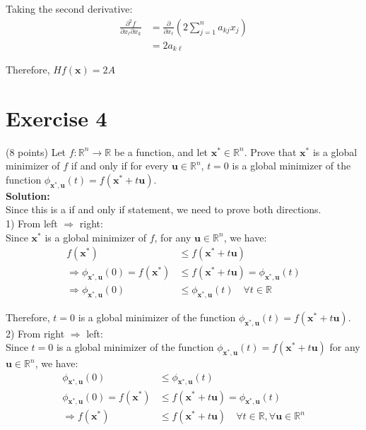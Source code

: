 \documentclass{article}
\begin{document}
Taking the second derivative:
\begin{align*}
\frac{\partial^2 f}{\partial x_\ell \partial x_k} &= \frac{\partial}{\partial x_\ell}(2\sum_{j=1}^n a_{kj}x_j) \\
&= 2a_{k\ell}
\end{align*}

Therefore, $Hf(\mathbf{x}) = 2A$

\newpage

\section*{Exercise 4}
(8 points) Let $f: \mathbb{R}^n \to \mathbb{R}$ be a function, and let $\mathbf{x}^* \in \mathbb{R}^n$. Prove that $\mathbf{x}^*$ is a global minimizer of $f$ if and only if for every $\mathbf{u} \in \mathbb{R}^n$, $t = 0$ is a global minimizer of the function $\phi_{\mathbf{x}^*,\mathbf{u}}(t) = f(\mathbf{x}^* + t\mathbf{u})$. \\

\textbf{Solution:} \\

Since this is a if and only if statement, we need to prove both directions. \\

1) From left $\Rightarrow$ right: \\

Since $\mathbf{x}^*$ is a global minimizer of $f$, for any $\mathbf{u} \in \mathbb{R}^n$, we have:
\begin{align*}
    f(\mathbf{x}^*) &\leq f(\mathbf{x}^* + t\mathbf{u}) \\
    \Rightarrow \phi_{\mathbf{x}^*,\mathbf{u}}(0) = f(\mathbf{x}^*) &\leq f(\mathbf{x}^* + t\mathbf{u}) = \phi_{\mathbf{x}^*,\mathbf{u}}(t) \\
    \Rightarrow \phi_{\mathbf{x}^*,\mathbf{u}}(0) &\leq \phi_{\mathbf{x}^*,\mathbf{u}}(t) \quad \forall t \in \mathbb{R}
\end{align*}

Therefore, $t = 0$ is a global minimizer of the function $\phi_{\mathbf{x}^*,\mathbf{u}}(t) = f(\mathbf{x}^* + t\mathbf{u})$. \\

2) From right $\Rightarrow$ left: \\

Since $t = 0$ is a global minimizer of the function $\phi_{\mathbf{x}^*,\mathbf{u}}(t) = f(\mathbf{x}^* + t\mathbf{u})$ for any $\mathbf{u} \in \mathbb{R}^n$, we have:
\begin{align*}
    \phi_{\mathbf{x}^*,\mathbf{u}}(0) &\leq \phi_{\mathbf{x}^*,\mathbf{u}}(t) \\
    \phi_{\mathbf{x}^*,\mathbf{u}}(0) = f(\mathbf{x}^*) &\leq f(\mathbf{x}^* + t\mathbf{u}) = \phi_{\mathbf{x}^*,\mathbf{u}}(t) \\
    \Rightarrow f(\mathbf{x}^*) &\leq f(\mathbf{x}^* + t\mathbf{u}) \quad \forall t \in \mathbb{R}, \forall \mathbf{u} \in \mathbb{R}^n
\end{align*}
\end{document}
